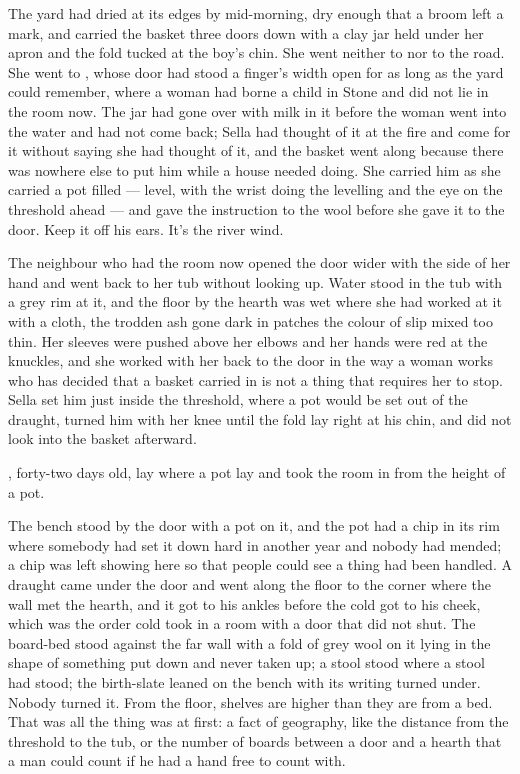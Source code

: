 
The yard had dried at its edges by mid-morning, dry enough that a broom left a mark, and  carried the basket three doors down with a clay jar held under her apron and the fold tucked at the boy's chin. She went neither to  nor to the road. She went to , whose door had stood a finger's width open for as long as the yard could remember, where a woman had borne a child in Stone and did not lie in the room now. The jar had gone over with milk in it before the woman went into the water and had not come back; Sella had thought of it at the fire and come for it without saying she had thought of it, and the basket went along because there was nowhere else to put him while a house needed doing. She carried him as she carried a pot filled --- level, with the wrist doing the levelling and the eye on the threshold ahead --- and gave the instruction to the wool before she gave it to the door. Keep it off his ears. It's the river wind.

The neighbour who had the room now opened the door wider with the side of her hand and went back to her tub without looking up. Water stood in the tub with a grey rim at it, and the floor by the hearth was wet where she had worked at it with a cloth, the trodden ash gone dark in patches the colour of slip mixed too thin. Her sleeves were pushed above her elbows and her hands were red at the knuckles, and she worked with her back to the door in the way a woman works who has decided that a basket carried in is not a thing that requires her to stop. Sella set him just inside the threshold, where a pot would be set out of the draught, turned him with her knee until the fold lay right at his chin, and did not look into the basket afterward.

, forty-two days old, lay where a pot lay and took the room in from the height of a pot.

The bench stood by the door with a pot on it, and the pot had a chip in its rim where somebody had set it down hard in another year and nobody had mended; a chip was left showing here so that people could see a thing had been handled. A draught came under the door and went along the floor to the corner where the wall met the hearth, and it got to his ankles before the cold got to his cheek, which was the order cold took in a room with a door that did not shut. The board-bed stood against the far wall with a fold of grey wool on it lying in the shape of something put down and never taken up; a stool stood where a stool had stood; the birth-slate leaned on the bench with its writing turned under. Nobody turned it. From the floor, shelves are higher than they are from a bed. That was all the thing was at first: a fact of geography, like the distance from the threshold to the tub, or the number of boards between a door and a hearth that a man could count if he had a hand free to count with.

